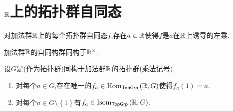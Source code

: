 \section{\texorpdfstring{$\mathbb{R}$}{R}上的拓扑群自同态}

\begin{proposition}{}{}
	对加法群$\mathbb{R}$上的每个拓扑群自同态$f$,存在$a\in\mathbb{R}$使得$f$是$a$在$\mathbb{R}$上诱导的左乘.
\end{proposition}

\begin{corollary}{}{}
	加法群$\mathbb{R}$的自同构群同构于$\mathbb{R}^{\times}$.
\end{corollary}

\begin{corollary}{}{}
	设$G$是(作为拓扑群)同构于加法群$\mathbb{R}$的拓扑群(乘法记号).
	\begin{enumerate}
		\item 对每个$a\in G$,存在唯一的$f_{a}\in\operatorname{Hom}_{\mathsf{TopGrp}}\left(\mathbb{R},G\right)$使得$f_{a}\left(1\right)=a$.
		\item 对每个$a\in G\setminus\left\{1\right\}$有$f_{a}\in\operatorname{Isom}_{\mathsf{TopGrp}}\left(\mathbb{R},G\right)$.
	\end{enumerate}
\end{corollary}